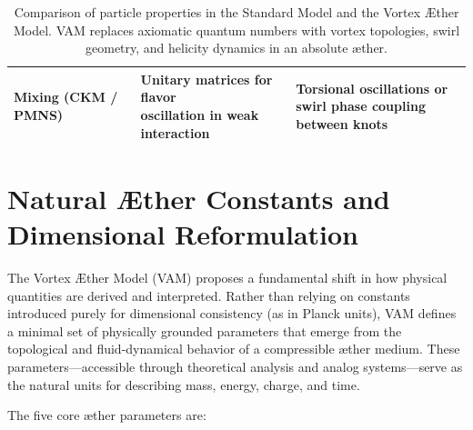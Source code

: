 \documentclass[12pt]{article}
\begin{document}
\begin{table}[H]
\begin{tabular}{|l|l|l|}
        \textbf{Mixing (CKM / PMNS)} &
        \makecell[l]{Unitary matrices for flavor \\ oscillation in weak interaction} &
        \makecell[l]{Torsional oscillations or \\ swirl phase coupling between knots} \\
        \hline

    \end{tabular}
    \caption{Comparison of particle properties in the Standard Model and the Vortex Æther Model. VAM replaces axiomatic quantum numbers with vortex topologies, swirl geometry, and helicity dynamics in an absolute æther.}
    \label{tab:SM_vs_VAM_particles}
\end{table}
\section{Natural Æther Constants and Dimensional Reformulation}

The Vortex Æther Model (VAM) proposes a fundamental shift in how physical quantities are derived and interpreted. Rather than relying on constants introduced purely for dimensional consistency (as in Planck units), VAM defines a minimal set of physically grounded parameters that emerge from the topological and fluid-dynamical behavior of a compressible æther medium. These parameters—accessible through theoretical analysis and analog systems—serve as the natural units for describing mass, energy, charge, and time.

The five core æther parameters are:
\end{document}
